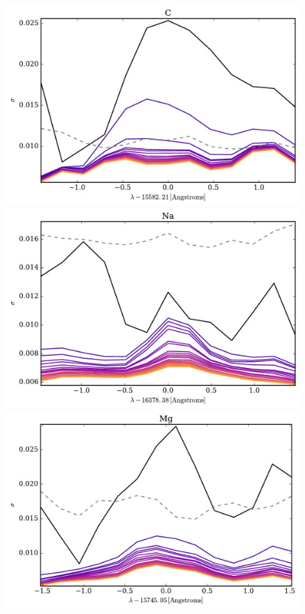 \documentclass[a4paper,fleqn,usenatbib]{mnras}
\begin{document}
\begin{figure}
	\includegraphics[width=\columnwidth]{apogee_centers_final_29502_spc_iw_prior_win_wid_1p5_c_conditional_stddevs.pdf}
	\includegraphics[width=\columnwidth]{apogee_centers_final_29502_spc_iw_prior_win_wid_1p5_na_conditional_stddevs.pdf}
	\includegraphics[width=\columnwidth]{apogee_centers_final_29502_spc_iw_prior_win_wid_1p5_mg_conditional_stddevs.pdf}

\end{figure}
\end{document}
